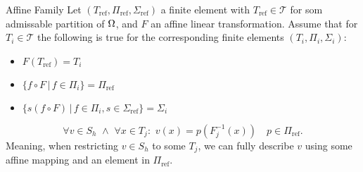 \iffalse \begin{defn}{Affine Family}
    A family of finite element spaces $S_h$ for partitions $\mathcal{T}_h$ of 
    $\OO\subset \RR^d$ is called an affine family if there exists a finite reference
    element $(T_{\text{ref}}, \Pi_{\text{ref}},\Sigma)$, such that, beside the 
    usual properties of a finite element, there exists some affine mappings 
    $F_j:T_{\text{ref}}\to T_j$ such that
    \begin{equation*}
        \forall v \in S_h \,\,\land \,\, \forall x \in T_j:\,\, v(x) = p(F^{-1}_j(x)) \quad 
        p \in \Pi_{\text{ref}}.
    \end{equation*}
    Meaning, when restricting $v\in S_h$ to some $T_j$, we can fully describe 
    $v$ using some affine mapping and an element in $\Pi_{\text{ref}}$.
\end{defn}
\fi
\begin{defn}{Affine Family}
    Let $(T_{\text{ref}}, \Pi_{\text{ref}},\Sigma_{\text{ref}})$ a finite element 
    with $T_{\text{ref}}\in \mathcal{T}$ for som admissable partition of 
    $\Omega$, and 
    $F$ an affine linear transformation. 
    Assume that for $T_i\in\mathcal{T}$ the following 
    is true for the corresponding finite elements $(T_i, \Pi_i,\Sigma_i)$:
    \begin{itemize}
        \item $F(T_{\text{ref}}) = T_i$
        \item $\{ f\circ F \,|\,  f \in \Pi_i \} =\Pi_{\text{ref}}  $
        \item $\{ s(f\circ F) \,|\, f \in \Pi_i, s \in \Sigma_{\text{ref}} \} = \Sigma_i$
    \end{itemize}


    \begin{equation*}
        \forall v \in S_h \,\,\land \,\, \forall x \in T_j:\,\, v(x) = p(F^{-1}_j(x)) \quad 
        p \in \Pi_{\text{ref}}.
    \end{equation*}
    Meaning, when restricting $v\in S_h$ to some $T_j$, we can fully describe 
    $v$ using some affine mapping and an element in $\Pi_{\text{ref}}$.
\end{defn}
